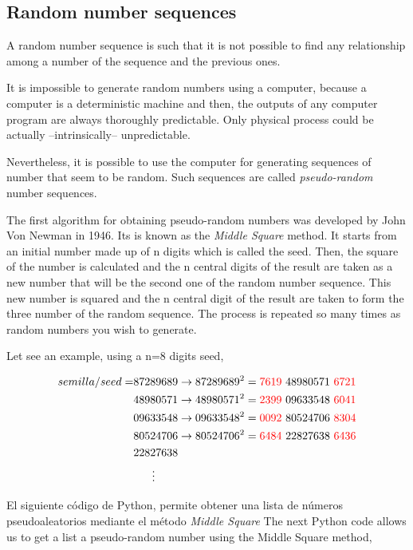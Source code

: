 \begin{paracol}{2}
\section{Random number sequences}
A random number sequence is such that it is not possible to find any relationship among a number of the sequence and the previous ones.

It is impossible to generate random numbers using a computer, because a computer is a deterministic machine and then, the outputs of any computer program are always thoroughly predictable. Only physical process could be actually --intrinsically-- unpredictable.

Nevertheless, it is possible to use the computer for generating sequences of number that seem to be random. Such sequences are called \emph{pseudo-random} number sequences.

The first algorithm for obtaining pseudo-random numbers was developed by John Von Newman in 1946. Its is known as the \emph{Middle Square} method. It starts from an initial number made up of n digits which is called the seed. Then, the square of the number is calculated and the n central digits of the result are taken as a new number that will be the second one of the random number sequence. This new number is squared and the n central digit of the result are taken to form the three number of the random sequence. The process is repeated so many times as random numbers you wish to generate.

Let see an example, using a n=8 digits seed, 

\end{paracol}
\begin{align*}
semilla/seed=&87289689 \rightarrow
87289689^2={\color{red}7619}\ 48980571\ {\color{red}6721}\\
&48980571\rightarrow
48980571^2={\color{red}2399}\ 09633548\ {\color{red}6041}\\
&09633548 \rightarrow
09633548^2={\color{red}0092}\ 80524706\ {\color{red}8304}\\
&80524706 \rightarrow
80524706^2={\color{red}6484}\ 22827638\ {\color{red}6436}\\
&22827638\\
&\ \ \ \ \ \vdots
\end{align*}
\begin{paracol}{2}
El siguiente código de Python, permite obtener una lista de números pseudoaleatorios mediante el método \emph{Middle Square}
\switchcolumn
The next Python code allows us to get a list a pseudo-random number using the Middle Square method,
\end{paracol}

